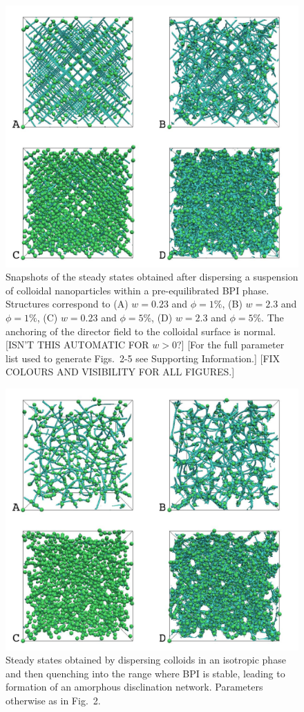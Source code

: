 \documentclass[12pt]{article}
\begin{document}
\begin{figure}
\includegraphics[width=\textwidth]{s1.jpg}
\caption{Snapshots of the steady states obtained after dispersing
a suspension of colloidal nanoparticles within a pre-equilibrated  BPI phase.  Structures correspond
to (A) $w=0.23$ and $\phi=1\%$, (B) $w=2.3$ and $\phi=1\%$,
(C) $w=0.23$ and $\phi=5\%$, (D) $w=2.3$ and $\phi=5\%$.
The anchoring of the director field to the colloidal surface is normal. [ISN'T THIS AUTOMATIC FOR $w>0$?]
[For the full parameter list used to generate Figs.~2-5 see Supporting Information.] [FIX COLOURS AND VISIBILITY FOR ALL FIGURES.]}
\end{figure}

\begin{figure}
\includegraphics[width=\textwidth]{s2.jpg}
\caption{Steady states obtained by dispersing colloids in an isotropic phase and then quenching into the range where BPI is stable, leading to formation of an amorphous disclination network. Parameters otherwise as in Fig.~2.}
\end{figure}
\end{document}
